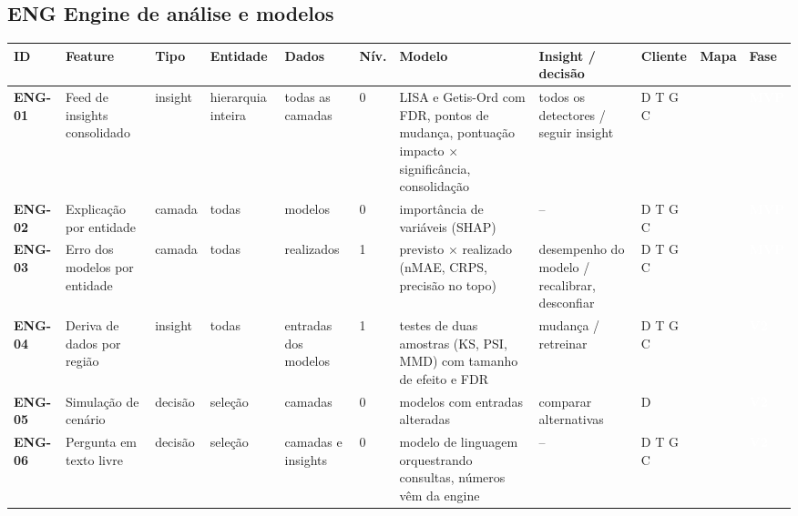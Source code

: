 \subsection*{ENG \textperiodcentered{} Engine de análise e modelos}
\label{cat:ENG}
{\footnotesize\setlength{\tabcolsep}{3pt}
\begin{longtable}{@{}P{1.35cm}P{4.1cm}P{1.3cm}P{3.1cm}P{3.7cm}C{0.6cm}P{3.6cm}P{3.3cm}P{1.1cm}P{0.9cm}P{1.1cm}@{}}
\toprule
\textbf{ID} & \textbf{Feature} & \textbf{Tipo} & \textbf{Entidade} & \textbf{Dados} & \textbf{Nív.} & \textbf{Modelo} & \textbf{Insight / decisão} & \textbf{Cliente} & \textbf{Mapa} & \textbf{Fase} \\
\midrule\endhead
\textbf{ENG-01} & Feed de insights consolidado & insight & hierarquia inteira & todas as camadas & 0 & LISA e Getis-Ord com FDR, pontos de mudança, pontuação impacto $\times$ significância, consolidação & todos os detectores / seguir insight & D T G C &  & \colorbox{fMVP}{\scriptsize \textcolor{white}{\textbf{MVP}}} \\
\textbf{ENG-02} & Explicação por entidade & camada & todas & modelos & 0 & importância de variáveis (SHAP) & -- & D T G C &  & \colorbox{fMVP}{\scriptsize \textcolor{white}{\textbf{MVP}}} \\
\textbf{ENG-03} & Erro dos modelos por entidade & camada & todas & realizados & 1 & previsto $\times$ realizado (nMAE, CRPS, precisão no topo) & desempenho do modelo / recalibrar, desconfiar & D T G C &  & \colorbox{fMVP}{\scriptsize \textcolor{white}{\textbf{MVP}}} \\
\textbf{ENG-04} & Deriva de dados por região & insight & todas & entradas dos modelos & 1 & testes de duas amostras (KS, PSI, MMD) com tamanho de efeito e FDR & mudança / retreinar & D T G C &  & \colorbox{fV2}{\scriptsize \textcolor{white}{\textbf{V2}}} \\
\textbf{ENG-05} & Simulação de cenário & decisão & seleção & camadas & 0 & modelos com entradas alteradas & comparar alternativas & D &  & \colorbox{fV2}{\scriptsize \textcolor{white}{\textbf{V2}}} \\
\textbf{ENG-06} & Pergunta em texto livre & decisão & seleção & camadas e insights & 0 & modelo de linguagem orquestrando consultas, números vêm da engine & -- & D T G C &  & \colorbox{fV2}{\scriptsize \textcolor{white}{\textbf{V2}}} \\
\bottomrule
\end{longtable}}

